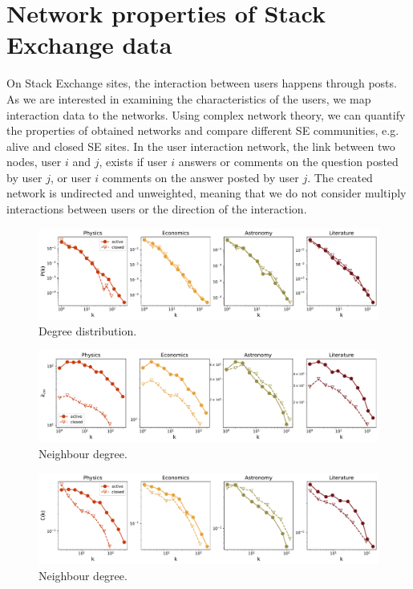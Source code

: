\section{Network properties of Stack Exchange data}

On Stack Exchange sites, the interaction between users happens through posts. As we are interested in examining the characteristics of the users, we map interaction data to the networks. Using complex network theory, we can quantify the properties of obtained networks and compare different SE communities, e.g. alive and closed SE sites. 
In the user interaction network, the link between two nodes, user $i$ and $j$, exists if user $i$ answers or comments on the question posted by user $j$, or user $i$ comments on the answer posted by user $j$. The created network is undirected and unweighted, meaning that we do not consider multiply interactions between users or the direction of the interaction. 


\begin{figure}[h]
	\centering
	\includegraphics[width=\linewidth]{figures/stackexchange/degree_distribution_fullnet.pdf}%
	\caption{Degree distribution.}
	\label{fig:fullnetdeg}
\end{figure}

\begin{figure}[h]
	\centering
	\includegraphics[width=\linewidth]{figures/stackexchange/neighdeg_fullnet.pdf}%
	\caption{Neighbour degree.}
	\label{fig:fullneighdeg}
\end{figure}

\begin{figure}[h]
	\centering
	\includegraphics[width=\linewidth]{figures/stackexchange/clustering_fullnet.pdf}%
	\caption{Neighbour degree.}
	\label{fig:fullneighdeg}
\end{figure}




